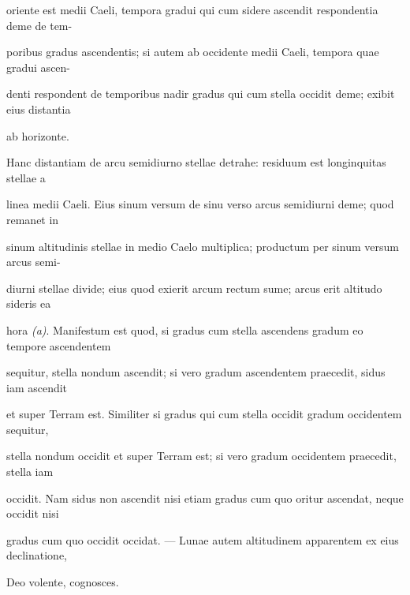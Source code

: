 \documentclass[11pt]{article}
\begin{document}
\noindent\hypertarget{AB01-PDF0124-body-L007}{}oriente est medii Caeli, tempora gradui qui cum sidere ascendit respondentia deme de tem-\strut\par
\noindent\hypertarget{AB01-PDF0124-body-L008}{}poribus gradus ascendentis; si autem ab occidente medii Caeli, tempora quae gradui ascen-\strut\par
\noindent\hypertarget{AB01-PDF0124-body-L009}{}denti respondent de temporibus nadir gradus qui cum stella occidit deme; exibit eius distantia\strut\par
\noindent\hypertarget{AB01-PDF0124-body-L010}{}ab horizonte.\strut\par
\noindent\hypertarget{AB01-PDF0124-body-L011}{}Hanc distantiam de arcu semidiurno stellae detrahe: residuum est longinquitas stellae a\strut\par
\noindent\hypertarget{AB01-PDF0124-body-L012}{}linea medii Caeli. Eius sinum versum de sinu verso arcus semidiurni deme; quod remanet in\strut\par
\noindent\hypertarget{AB01-PDF0124-body-L013}{}sinum altitudinis stellae in medio Caelo multiplica; productum per sinum versum arcus semi-\strut\par
\noindent\hypertarget{AB01-PDF0124-body-L014}{}diurni stellae divide; eius quod exierit arcum rectum sume; arcus erit altitudo sideris ea\strut\par
\noindent\hypertarget{AB01-PDF0124-body-L015}{}hora \textit{(a)}. Manifestum est quod, si gradus cum stella ascendens gradum eo tempore ascendentem\strut\par
\noindent\hypertarget{AB01-PDF0124-body-L016}{}sequitur, stella nondum ascendit; si vero gradum ascendentem praecedit, sidus iam ascendit\strut\par
\noindent\hypertarget{AB01-PDF0124-body-L017}{}et super Terram est. Similiter si gradus qui cum stella occidit gradum occidentem sequitur,\strut\par
\noindent\hypertarget{AB01-PDF0124-body-L018}{}stella nondum occidit et super Terram est; si vero gradum occidentem praecedit, stella iam\strut\par
\noindent\hypertarget{AB01-PDF0124-body-L019}{}occidit. Nam sidus non ascendit nisi etiam gradus cum quo oritur ascendat, neque occidit nisi\strut\par
\noindent\hypertarget{AB01-PDF0124-body-L020}{}gradus cum quo occidit occidat. — Lunae autem altitudinem apparentem ex eius declinatione,\strut\par
\noindent\hypertarget{AB01-PDF0124-body-L021}{}Deo volente, cognosces.\strut\par
\end{document}

